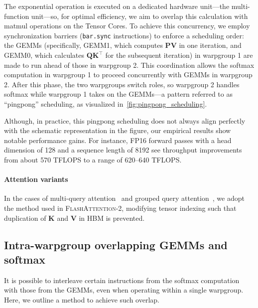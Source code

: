 The exponential operation is executed on a dedicated hardware unit—the multi-function unit—so, for optimal efficiency, we aim to overlap this calculation with matmul operations on the Tensor Cores. To achieve this concurrency, we employ synchronization barriers (\texttt{bar.sync} instructions) to enforce a scheduling order: the GEMMs (specifically, GEMM1, which computes $\mathbf{P} \mathbf{V}$ in one iteration, and GEMM0, which calculates $\mathbf{Q} \mathbf{K}^\top$ for the subsequent iteration) in warpgroup 1 are made to run ahead of those in warpgroup 2. This coordination allows the softmax computation in warpgroup 1 to proceed concurrently with GEMMs in warpgroup 2. After this phase, the two warpgroups switch roles, so warpgroup 2 handles softmax while warpgroup 1 takes on the GEMMs—a pattern referred to as “pingpong” scheduling, as visualized in~\cref{fig:pingpong_scheduling}. 

Although, in practice, this pingpong scheduling does not always align perfectly with the schematic representation in the figure, our empirical results show notable performance gains. For instance, FP16 forward passes with a head dimension of 128 and a sequence length of 8192 see throughput improvements from about 570 TFLOPS to a range of 620–640 TFLOPS.

\paragraph{Attention variants} In the cases of multi-query attention~\citep{shazeer2019fast} and grouped query attention~\citep{ainslie2023gqa}, we adopt the method used in \textsc{FlashAttention-2}, modifying tensor indexing such that duplication of $\mathbf{K}$ and $\mathbf{V}$ in HBM is prevented.

\subsection{Intra-warpgroup overlapping GEMMs and softmax}

It is possible to interleave certain instructions from the softmax computation with those from the GEMMs, even when operating within a single warpgroup. Here, we outline a method to achieve such overlap.

